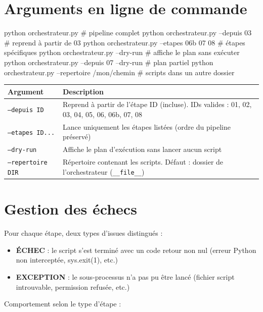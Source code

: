 \documentclass[12pt,a4paper,french]{report}
\begin{document}
\section{Arguments en ligne de commande}

\begin{codebox}[]
python orchestrateur.py                          # pipeline complet
python orchestrateur.py --depuis 03             # reprend à partir de 03
python orchestrateur.py --etapes 06b 07 08      # étapes spécifiques
python orchestrateur.py --dry-run               # affiche le plan sans exécuter
python orchestrateur.py --depuis 07 --dry-run   # plan partiel
python orchestrateur.py --repertoire /mon/chemin # scripts dans un autre dossier
\end{codebox}

\begin{tabularx}{\textwidth}{lX}
  \toprule
  \textbf{Argument} & \textbf{Description} \\
  \midrule
  \texttt{--depuis ID} &
    Reprend à partir de l'étape ID (incluse). IDs valides :
    01, 02, 03, 04, 05, 06, 06b, 07, 08 \\
  \texttt{--etapes ID...} &
    Lance uniquement les étapes listées (ordre du pipeline préservé) \\
  \texttt{--dry-run} &
    Affiche le plan d'exécution sans lancer aucun script \\
  \texttt{--repertoire DIR} &
    Répertoire contenant les scripts.
    Défaut : dossier de l'orchestrateur (\texttt{\_\_file\_\_}) \\
  \bottomrule
\end{tabularx}

\section{Gestion des échecs}

Pour chaque étape, deux types d'issues distingués :

\begin{itemize}
  \item \textbf{ÉCHEC} : le script s'est terminé avec un code retour non nul
        (erreur Python non interceptée, sys.exit(1), etc.)
  \item \textbf{EXCEPTION} : le sous-processus n'a pas pu être lancé (fichier
        script introuvable, permission refusée, etc.)
\end{itemize}

Comportement selon le type d'étape :
\end{document}
